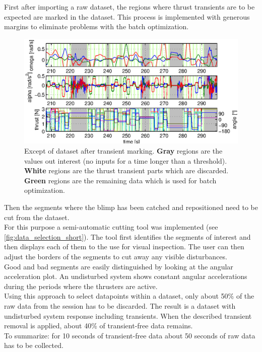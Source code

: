 First after importing a raw dataset, the regions where thrust transients are to be expected are marked in the dataset.
This process is implemented with generous margins to eliminate problems with the batch optimization.

\begin{figure}[htbp]
\centering
\includegraphics[scale=0.8]{images/interactive_cut/interactive_cut_long_modified.eps}
\caption{Except of dataset after transient marking. \textbf{Gray} regions are the values out interest (no inputs for a time longer than a threshold). \textbf{White} regions are the thrust transient parts which are discarded. \textbf{Green} regions are the remaining data which is used for batch optimization.}
\label{fig:data_selection_long}
\end{figure}

Then the segments where the blimp has been catched and repositioned need to be cut from the dataset. \\
For this purpose a semi-automatic cutting tool was implemented (see \cref{fig:data_selection_short}). 
The tool first identifies the segments of interest and then displays each of them to the use for visual inspection.
The user can then adjust the borders of the segments to cut away any visible disturbances. \\
Good and bad segments are easily distinguished by looking at the angular acceleration plot.
An undisturbed system shows constant angular accelerations during the periods where the thrusters are active. \\
Using this approach to select datapoints within a dataset, only about 50\% of the raw data from the session has to be discarded.
The result is a dataset with undisturbed system response including transients.
When the described transient removal is applied, about 40\% of transient-free data remains.\\
To summarize: for 10 seconds of transient-free data about 50 seconds of raw data has to be collected.

